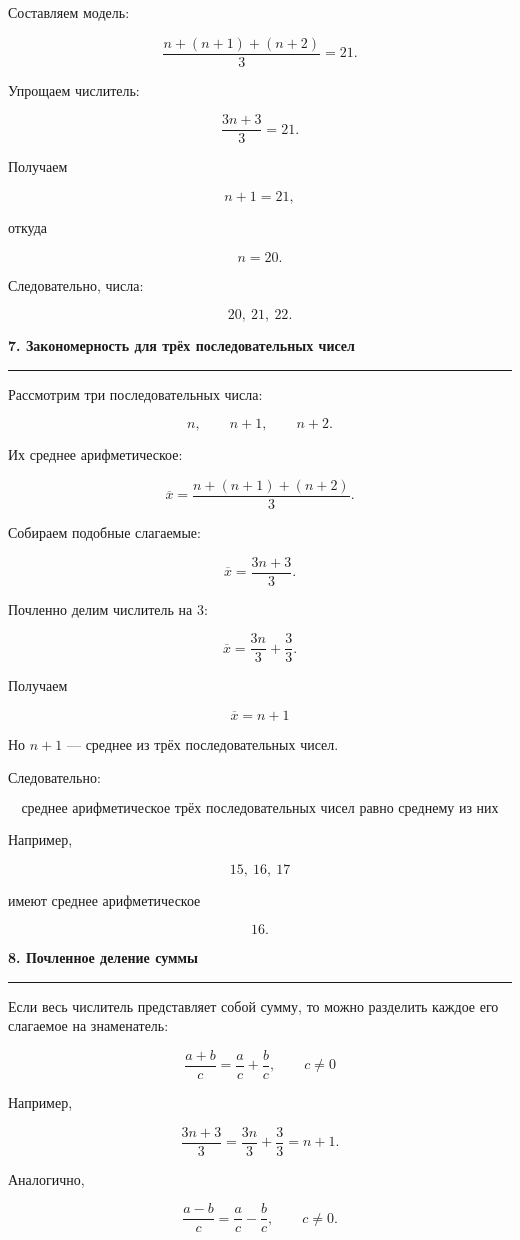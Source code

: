 \documentclass[a4paper,12pt]{article}
\newcommand{\topicsection}[1]{%
    \vspace{0.7em}
    {\Large\bfseries\color{darkaccent}#1}\par
    \vspace{0.15em}
    {\color{accent}\rule{\linewidth}{0.7pt}}
    \vspace{0.35em}
}
\begin{document}
Составляем модель:

\[
\frac{n+(n+1)+(n+2)}{3}=21.
\]

Упрощаем числитель:

\[
\frac{3n+3}{3}=21.
\]

Получаем

\[
n+1=21,
\]

откуда

\[
n=20.
\]

Следовательно, числа:

\[
\boxed{20,\ 21,\ 22}.
\]

\topicsection{7. Закономерность для трёх последовательных чисел}

Рассмотрим три последовательных числа:

\[
n,\qquad n+1,\qquad n+2.
\]

Их среднее арифметическое:

\[
\overline{x}
=
\frac{n+(n+1)+(n+2)}{3}.
\]

Собираем подобные слагаемые:

\[
\overline{x}
=
\frac{3n+3}{3}.
\]

Почленно делим числитель на \(3\):

\[
\overline{x}
=
\frac{3n}{3}
+
\frac{3}{3}.
\]

Получаем

\[
\boxed{
\overline{x}=n+1
}
\]

Но \(n+1\) --- среднее из трёх последовательных чисел.

Следовательно:

\[
\boxed{
\text{среднее арифметическое трёх последовательных чисел
равно среднему из них}
}
\]

Например,

\[
15,\ 16,\ 17
\]

имеют среднее арифметическое

\[
\boxed{16}.
\]

\topicsection{8. Почленное деление суммы}

Если весь числитель представляет собой сумму, то можно разделить каждое его слагаемое на знаменатель:

\[
\boxed{
\frac{a+b}{c}
=
\frac{a}{c}+\frac{b}{c},
\qquad c\ne0
}
\]

Например,

\[
\frac{3n+3}{3}
=
\frac{3n}{3}+\frac{3}{3}
=
n+1.
\]

Аналогично,

\[
\frac{a-b}{c}
=
\frac{a}{c}-\frac{b}{c},
\qquad c\ne0.
\]
\end{document}
